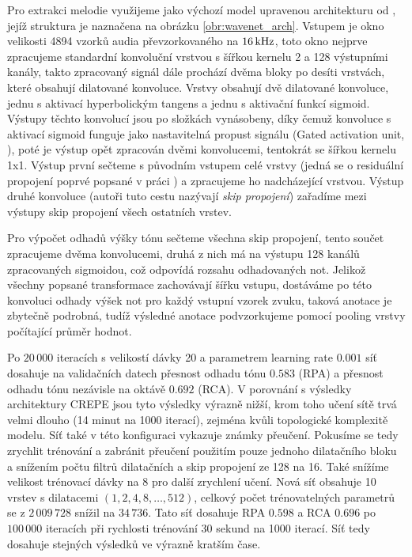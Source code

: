 Pro extrakci melodie využijeme jako výchozí model upravenou architekturu od \cite{Martak2018}, jejíž struktura je naznačena na obrázku \ref{obr:wavenet_arch}. Vstupem je okno velikosti 4894 vzorků audia převzorkovaného na $16\,\rm kHz$, toto okno nejprve zpracujeme standardní konvoluční vrstvou s šířkou kernelu 2 a 128 výstupními kanály, takto zpracovaný signál dále prochází dvěma bloky po desíti vrstvách, které obsahují dilatované konvoluce. Vrstvy obsahují dvě dilatované konvoluce, jednu s aktivací hyperbolickým tangens a jednu s aktivační funkcí sigmoid. Výstupy těchto konvolucí jsou po složkách vynásobeny, díky čemuž konvoluce s aktivací sigmoid funguje jako nastavitelná propust signálu (Gated activation unit, \cite{Oord2016a}), poté je výstup opět zpracován dvěmi konvolucemi, tentokrát se šířkou kernelu 1x1. Výstup první sečteme s původním vstupem celé vrstvy (jedná se o residuální propojení poprvé popsané v práci \cite{He2015}) a zpracujeme ho nadcházející vrstvou. Výstup druhé konvoluce (autoři tuto cestu nazývají \emph{skip propojení}) zařadíme mezi výstupy skip propojení všech ostatních vrstev.

Pro výpočet odhadů výšky tónu sečteme všechna skip propojení, tento součet zpracujeme dvěma konvolucemi, druhá z nich má na výstupu 128 kanálů zpracovaných sigmoidou, což odpovídá rozsahu odhadovaných not. Jelikož všechny popsané transformace zachovávají šířku vstupu, dostáváme po této konvoluci odhady výšek not pro každý vstupní vzorek zvuku, taková anotace je zbytečně podrobná, tudíž výsledné anotace podvzorkujeme pomocí pooling vrstvy počítající průměr hodnot.

Po $20\,000$ iteracích s velikostí dávky 20 a parametrem learning rate $0.001$ síť dosahuje na validačních datech přesnost odhadu tónu $0.583$ (RPA) a přesnost odhadu tónu nezávisle na oktávě $0.692$ (RCA). V porovnání s výsledky architektury CREPE jsou tyto výsledky výrazně nižší, krom toho učení sítě trvá velmi dlouho (14 minut na 1000 iterací), zejména kvůli topologické komplexitě modelu. Síť také v této konfiguraci vykazuje známky přeučení. Pokusíme se tedy zrychlit trénování a zabránit přeučení použitím pouze jednoho dilatačního bloku a snížením počtu filtrů dilatačních a skip propojení ze 128 na 16. Také snížíme velikost trénovací dávky na 8 pro další zrychlení učení. Nová síť obsahuje 10 vrstev s dilatacemi $(1, 2, 4, 8, \dots, 512)$, celkový počet trénovatelných parametrů se z $2\,009\,728$ snížil na $34\,736$. Tato síť dosahuje RPA $0.598$ a RCA $0.696$ po $100\,000$ iteracích při rychlosti trénování 30 sekund na 1000 iterací. Síť tedy dosahuje stejných výsledků ve výrazně kratším čase.

